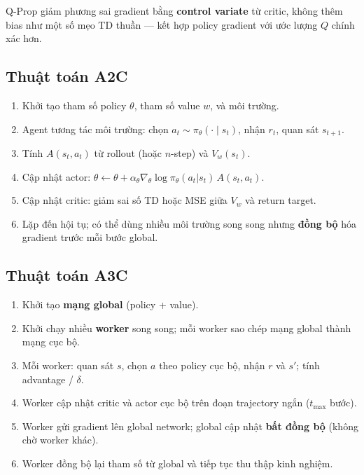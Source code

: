 \begin{ynghia}[title={Q-Prop}]
Q-Prop giảm phương sai gradient bằng \textbf{control variate} từ critic, không thêm bias như một số mẹo TD thuần --- kết hợp policy gradient với ước lượng $Q$ chính xác hơn.
\end{ynghia}

\subsection{Thuật toán A2C}

\begin{phuongphap}[title={Các bước A2C}]
\begin{enumerate}
  \item Khởi tạo tham số policy $\theta$, tham số value $w$, và môi trường.
  \item Agent tương tác môi trường: chọn $a_t \sim \pi_\theta(\cdot \mid s_t)$, nhận $r_t$, quan sát $s_{t+1}$.
  \item Tính $A(s_t,a_t)$ từ rollout (hoặc $n$-step) và $V_w(s_t)$.
  \item Cập nhật actor: $\theta \leftarrow \theta + \alpha_\theta \nabla_\theta \log \pi_\theta(a_t|s_t)\, A(s_t,a_t)$.
  \item Cập nhật critic: giảm sai số TD hoặc MSE giữa $V_w$ và return target.
  \item Lặp đến hội tụ; có thể dùng nhiều môi trường song song nhưng \textbf{đồng bộ} hóa gradient trước mỗi bước global.
\end{enumerate}
\end{phuongphap}

\subsection{Thuật toán A3C}

\begin{phuongphap}[title={Các bước A3C}]
\begin{enumerate}
  \item Khởi tạo \textbf{mạng global} (policy + value).
  \item Khởi chạy nhiều \textbf{worker} song song; mỗi worker sao chép mạng global thành mạng cục bộ.
  \item Mỗi worker: quan sát $s$, chọn $a$ theo policy cục bộ, nhận $r$ và $s'$; tính advantage / $\delta$.
  \item Worker cập nhật critic và actor cục bộ trên đoạn trajectory ngắn ($t_{\max}$ bước).
  \item Worker gửi gradient lên global network; global cập nhật \textbf{bất đồng bộ} (không chờ worker khác).
  \item Worker đồng bộ lại tham số từ global và tiếp tục thu thập kinh nghiệm.
\end{enumerate}
\end{phuongphap}

